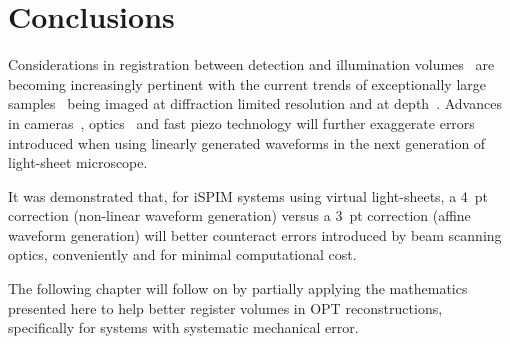 \section{Conclusions}

Considerations in registration between detection and illumination volumes~\cite{royer_adaptive_2016} are becoming increasingly pertinent with the current trends of exceptionally large samples~\cite{chen_expansion_2015} being imaged at diffraction limited resolution and at depth~\cite{wang_direct_2015,truong_deep_2011}.
Advances in cameras~\cite{zheng_0.5_2014,brady_multiscale_2012}, optics~\cite{sofroniew_large_2016} and fast piezo technology will further exaggerate errors introduced when using linearly generated waveforms in the next generation of light-sheet microscope.

It was demonstrated that, for \gls{iSPIM} systems using virtual light-sheets, a 4~pt correction (non-linear waveform generation) versus a 3~pt correction (affine waveform generation) will better counteract errors introduced by beam scanning optics, conveniently and for minimal computational cost.

The following chapter will follow on by partially applying the mathematics presented here to help better register volumes in \gls{OPT} reconstructions, specifically for systems with systematic mechanical error.







